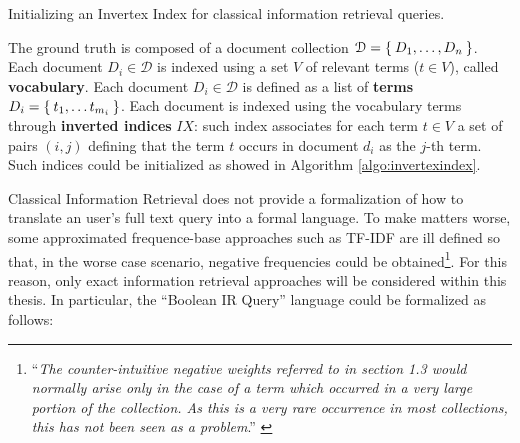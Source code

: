 \begin{algorithm}[!t]
\begin{algorithmic}
	\EndIf
	\EndFor
\EndFor	
\end{algorithmic}
\caption{Initializing an Invertex Index for classical information retrieval queries.}
\label{algo:invertexindex}	
\end{algorithm}


\begin{definition}
The ground truth is composed of a document collection $\mathcal{D}=\Set{D_1,\dots, D_n}$. Each document $D_i\in \mathcal{D}$ is indexed using a set $V$ of relevant terms ($t\in V$), called \textbf{vocabulary}. Each document $D_i\in \mathcal{D}$ is defined as a list of \textbf{terms} $D_i=\Set{t_1,\dots t_{m_i}}$. Each document is indexed using the vocabulary terms through \textbf{inverted indices} $IX$: such index associates for each term $t\in V$ a set of pairs $(i,j)$ defining that the term $t$ occurs in document $d_i$ as the $j$-th term. Such indices could be initialized as showed in Algorithm \ref{algo:invertexindex}.
\end{definition} 

Classical Information Retrieval does not provide a formalization of how to translate an user's full text query into a formal language. To make matters worse, some approximated frequence-base approaches such as TF-IDF are ill defined so that, in the worse case scenario, negative frequencies could be obtained\footnote{``\textit{The counter-intuitive negative weights referred to in section 1.3 would normally arise only in the case of a term which occurred in a very large portion of the collection. As this is a very rare occurrence in most collections, this has not been seen as a problem}.'' \cite{IDFNegative}}. For this reason, only exact information retrieval approaches will be considered within this thesis. In particular, the ``Boolean IR Query'' language could be formalized as follows:

